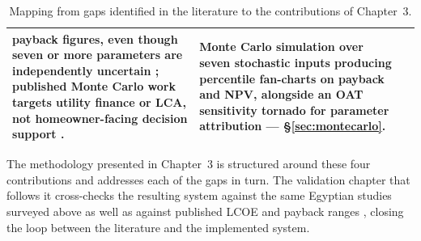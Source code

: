 \begin{table}[h]
\begin{tabularx}{\textwidth}{@{} l X X @{}}
        payback figures, even though seven or more parameters are
        independently uncertain \citep{jordan2013, ieapvps2021,
        spertino2014}; published Monte Carlo work targets utility
        finance or LCA, not homeowner-facing decision support
        \citep{drury2012, lacirignola2017}.
      & Monte Carlo simulation over seven stochastic inputs producing
        percentile fan-charts on payback and NPV, alongside an OAT
        sensitivity tornado for parameter attribution
        --- \S\ref{sec:montecarlo}. \\
    \bottomrule
  \end{tabularx}
  \caption{Mapping from gaps identified in the literature to the
  contributions of Chapter~3.}
  \label{tab:gap-map}
\end{table}

The methodology presented in Chapter~3 is structured around these
four contributions and addresses each of the gaps in turn. The
validation chapter that follows it cross-checks the resulting system
against the same Egyptian studies surveyed above
\citep{mahmoud2023, esmail-negm-2021} as well as against published
LCOE and payback ranges \citep{branker2011, irena2023}, closing the
loop between the literature and the implemented system.
